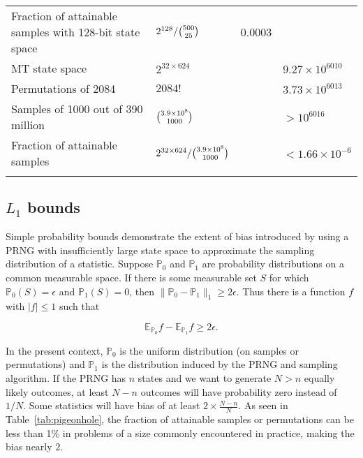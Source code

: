 \documentclass[graybox]{svmult}
\begin{document}
\begin{table}
\begin{tabular}[h]{p{4.7cm}p{2.4cm}p{3.9cm}p{2cm}}
Fraction of attainable samples with 128-bit state space & ${2^{128}}/{\tbinom{500}{25}}$ &  0.0003 & \\
\noalign{\smallskip}\svhline\noalign{\smallskip}
MT state space & $2^{32 \times 624}$ & & $9.27\times 10^{6010}$ \\
Permutations of 2084 & $2084!$ &   & $3.73 \times 10^{6013}$ \\
Samples of 1000 out of 390 million & $\tbinom{3.9\times 10^8}{1000}$ & & $> 10^{6016}$ \\
Fraction of attainable samples & ${2^{32 \times 624}}/{\tbinom{3.9\times 10^8}{1000}}$ &  & $< 1.66 \times 10^{-6}$ \\
\noalign{\smallskip}\svhline\noalign{\smallskip}
\end{tabular}
\end{table}

\subsection{$L_1$ bounds}\label{sec:L1bounds}

Simple probability bounds demonstrate the extent of bias introduced by using a PRNG with insufficiently large
state space to approximate the sampling distribution of a statistic.
Suppose ${\mathbb P}_0$ and ${\mathbb P}_1$ are probability distributions on a common measurable space. 
If there is some measurable set $S$ for which ${\mathbb P}_0(S) = \epsilon$ and ${\mathbb P}_1(S) = 0$, then $\|{\mathbb P}_0 - {\mathbb P}_1 \|_1 \ge 2 \epsilon$.
Thus there is a function $f$ with $|f| \le 1$ such that 

$${\mathbb E}_{{\mathbb P}_0}f -  {\mathbb E}_{{\mathbb P}_1}f \ge 2 \epsilon.$$

In the present context, ${\mathbb P}_0$ is the uniform distribution (on samples or permutations)
and ${\mathbb P}_1$ is the distribution induced by the PRNG and sampling algorithm.
If the PRNG has $n$ states and we want to generate $N>n$ equally likely outcomes, at least $N-n$ outcomes will have probability zero instead of $1/N$.
Some statistics will have bias of at least $2 \times \frac{N-n}{N}$.
As seen in Table~\ref{tab:pigeonhole}, the fraction of attainable samples or 
permutations can be less than 1\% in problems of a size commonly encountered
in practice, making the bias nearly $2$. 
\end{document}

